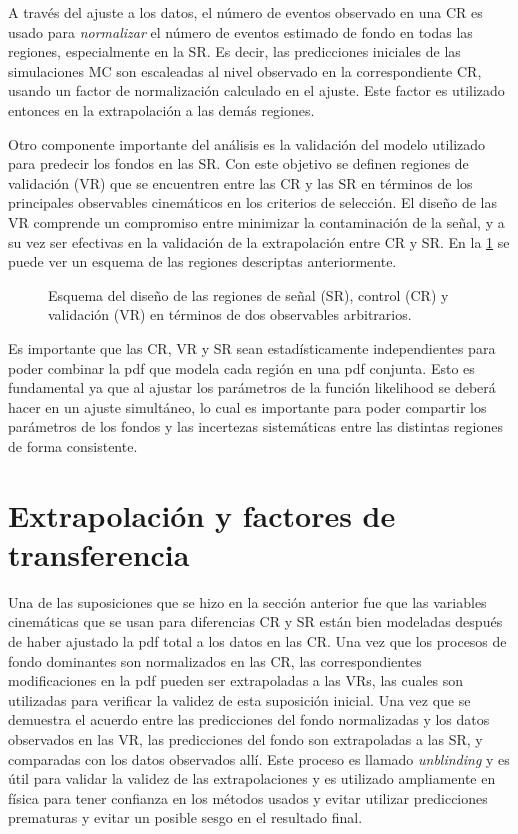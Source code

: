 A través del ajuste a los datos, el número de eventos observado en una CR es
usado para \emph{normalizar} el número de eventos estimado de fondo en todas las
regiones, especialmente en la SR. Es decir, las predicciones iniciales de las
simulaciones MC son escaleadas al nivel observado en la correspondiente CR,
usando un factor de normalización calculado en el ajuste. Este factor es
utilizado entonces en la extrapolación a las demás regiones.

Otro componente importante del análisis es la validación del modelo utilizado
para predecir los fondos en las SR. Con este objetivo se definen regiones de
validación (VR) que se encuentren entre las CR y las SR en términos de los
principales observables cinemáticos en los criterios de selección. El diseño de
las VR comprende un compromiso entre minimizar la contaminación de la señal, y a su
vez ser efectivas en la validación de la extrapolación entre CR y SR. En la
\cref{fig:regions_sketch} se puede ver un esquema de las regiones descriptas
anteriormente.

\begin{figure}[h]
  \centering 
  \caption{Esquema del diseño de las regiones de señal (SR), control (CR) y
    validación (VR) en términos de dos observables arbitrarios.}
  \label{fig:regions_sketch}
\end{figure}

Es importante que las CR, VR y SR sean estadísticamente independientes para
poder combinar la pdf que modela cada región en una pdf conjunta. Esto es
fundamental ya que al ajustar los parámetros de la función likelihood se deberá
hacer en un ajuste simultáneo, lo cual es importante para poder compartir los
parámetros de los fondos y las incertezas sistemáticas entre las distintas
regiones de forma consistente.

\section{Extrapolación y factores de transferencia}

Una de las suposiciones que se hizo en la sección anterior fue que las variables
cinemáticas que se usan para diferencias CR y SR están bien modeladas
después de haber ajustado la pdf total a los datos en las CR. Una vez que los
procesos de fondo dominantes son normalizados en las CR, las correspondientes
modificaciones en la pdf pueden ser extrapoladas a las VRs, las cuales son
utilizadas para verificar la validez de esta suposición inicial. Una vez que se
demuestra el acuerdo entre las predicciones del fondo normalizadas y los datos
observados en las VR, las predicciones del fondo son extrapoladas a las SR,
y comparadas con los datos observados allí. Este proceso es llamado
\emph{unblinding} y es útil para validar la validez de las extrapolaciones y es
utilizado ampliamente en física para tener confianza en los métodos usados y
evitar utilizar predicciones prematuras y evitar un posible sesgo en el
resultado final.

